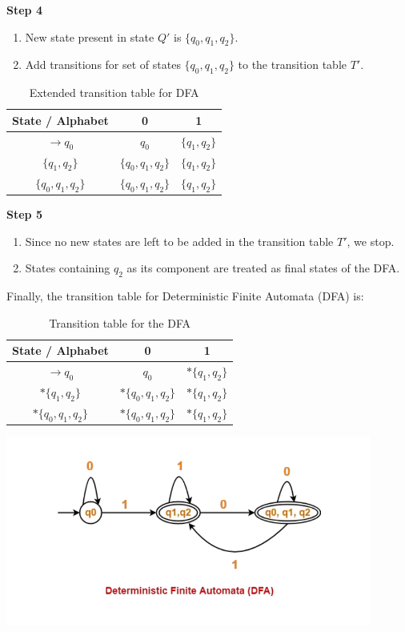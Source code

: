 \documentclass{article}
\begin{document}
\textbf{Step 4}
\begin{enumerate}
\item New state present in state $Q'$ is $\{q_0, q_1, q_2\}$.
\item Add transitions for set of states $\{q_0, q_1, q_2\}$ to the transition table $T'$.
\end{enumerate}
\begin{table}[h]
\centering
\begin{tabular}{c|c|c}
State / Alphabet & 0 & 1 \\ \hline
$\rightarrow q_0$ & $q_0$ & $\{q_1, q_2\}$ \\
$\{q_1, q_2\}$ & $\{q_0, q_1, q_2\}$ & $\{q_1, q_2\}$ \\
$\{q_0, q_1, q_2\}$ & $\{q_0, q_1, q_2\}$ & $\{q_1, q_2\}$ \\
\end{tabular}
\caption{Extended transition table for DFA}
\end{table}
\textbf{Step 5}
\begin{enumerate}
\item Since no new states are left to be added in the transition table $T'$, we stop.
\item States containing $q_2$ as its component are treated as final states of the DFA.
\end{enumerate}
Finally, the transition table for Deterministic Finite Automata (DFA) is:
\begin{table}[h]
\centering
\begin{tabular}{c|c|c}
State / Alphabet & 0 & 1 \\ \hline
$\rightarrow q_0$ & $q_0$ & $*\{q_1, q_2\}$ \\
$*\{q_1, q_2\}$ & $*\{q_0, q_1, q_2\}$ & $*\{q_1, q_2\}$ \\
$*\{q_0, q_1, q_2\}$ & $*\{q_0, q_1, q_2\}$ & $*\{q_1, q_2\}$ \\
\end{tabular}
\caption{Transition table for the DFA}
\end{table}
\begin{center}
    \includegraphics[width=12cm]{14.png}
\end{center}
\newpage
\end{document}
